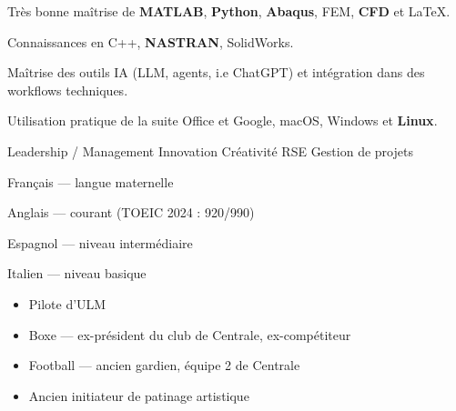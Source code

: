 

{\small
{}
}
\vspace{1em}


{\small Très bonne maîtrise de \textbf{MATLAB}, \textbf{Python}, \textbf{Abaqus}, FEM, \textbf{CFD} et LaTeX.

\vspace{9pt}
Connaissances en C++, \textbf{NASTRAN}, SolidWorks.

\vspace{9pt}
Maîtrise des outils IA (LLM, agents, i.e ChatGPT) et intégration dans des workflows techniques.

\vspace{9pt}
Utilisation pratique de la suite Office et Google, macOS, Windows et \textbf{Linux}.

}
\vspace{1em}
{\small Leadership / Management \textbullet{} Innovation \textbullet{} Créativité \textbullet{} RSE  \textbullet{} Gestion de projets}
\vspace{1em}

{\small Français — langue maternelle

\vspace{2pt}
Anglais — courant (TOEIC 2024 : 920/990)

\vspace{2pt}
Espagnol — niveau intermédiaire

\vspace{2pt}
Italien — niveau basique

}

\vspace{1em}

{\small
\begin{itemize}
  \item Pilote d'ULM
  \item Boxe — ex-président du club de Centrale, ex-compétiteur
  \item Football — ancien gardien, équipe 2 de Centrale
  \item Ancien initiateur de patinage artistique
\end{itemize}}